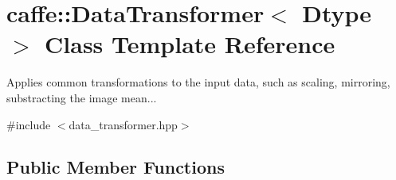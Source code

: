 \hypertarget{classcaffe_1_1DataTransformer}{}\section{caffe\+:\+:Data\+Transformer$<$ Dtype $>$ Class Template Reference}
\label{classcaffe_1_1DataTransformer}


Applies common transformations to the input data, such as scaling, mirroring, substracting the image mean...  




{\ttfamily \#include $<$data\+\_\+transformer.\+hpp$>$}

\subsection*{Public Member Functions}
